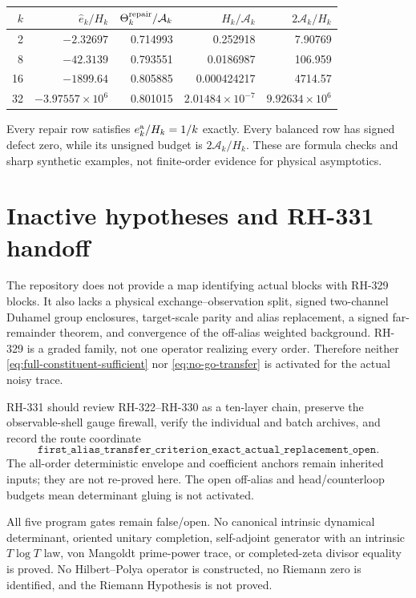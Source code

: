 \documentclass[11pt]{article}
\theoremstyle{remark}
\newcommand{\cA}{\mathcal A}
\newcommand{\wh}[1]{\widehat{#1}}
\begin{document}
\begin{center}
\begin{tabular}{@{}rrrrr@{}}
\toprule
$k$ & $\wh e_k/H_k$ & $\Theta_k^{\rm repair}/\cA_k$
& $H_k/\cA_k$ & $2\cA_k/H_k$\\
\midrule
2  & $-2.32697$ & 0.714993 & 0.252918 & 7.90769\\
8  & $-42.3139$ & 0.793551 & 0.0186987 & 106.959\\
16 & $-1899.64$ & 0.805885 & 0.000424217 & 4714.57\\
32 & $-3.97557{\times}10^6$ & 0.801015
   & $2.01484{\times}10^{-7}$ & $9.92634{\times}10^6$\\
\bottomrule
\end{tabular}
\end{center}

Every repair row satisfies $e_k^{\rm a}/H_k=1/k$ exactly.  Every balanced
row has signed defect zero, while its unsigned budget is $2\cA_k/H_k$.
These are formula checks and sharp synthetic examples, not finite-order
evidence for physical asymptotics.

\section{Inactive hypotheses and RH-331 handoff}

The repository does not provide a map identifying actual blocks with
RH-329 blocks.  It also lacks a physical exchange--observation split, signed
two-channel Duhamel group enclosures, target-scale parity and alias
replacement, a signed far-remainder theorem, and convergence of the
off-alias weighted background.  RH-329 is a graded family, not one operator
realizing every order.  Therefore neither
\eqref{eq:full-constituent-sufficient} nor \eqref{eq:no-go-transfer} is
activated for the actual noisy trace.

RH-331 should review RH-322--RH-330 as a ten-layer chain, preserve the
observable-shell gauge firewall, verify the individual and batch archives,
and record the route coordinate
\[
 \texttt{first\_alias\_transfer\_criterion\_exact\_actual\_replacement\_open}.
\]
The all-order deterministic envelope and coefficient anchors remain
inherited inputs; they are not re-proved here.  The open off-alias and
head/counterloop budgets mean determinant gluing is not activated.

All five program gates remain false/open.  No canonical intrinsic dynamical
determinant, oriented unitary completion, self-adjoint generator with an
intrinsic $T\log T$ law, von Mangoldt prime-power trace, or completed-zeta
divisor equality is proved.  No Hilbert--Polya operator is constructed, no
Riemann zero is identified, and the Riemann Hypothesis is not proved.
\end{document}
